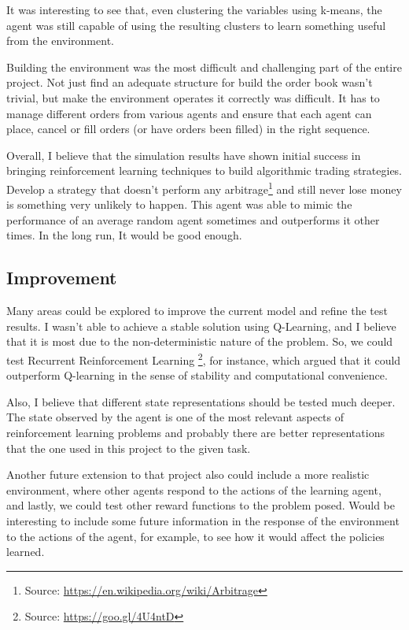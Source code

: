 \documentclass[a4paper]{article}
\begin{document}
It was interesting to see that, even clustering the variables using k-means, the agent was still capable of using the resulting clusters to learn something useful from the environment.

Building the environment was the most difficult and challenging part of the entire project. Not just find an adequate structure for build the order book wasn't trivial, but make the environment operates it correctly was difficult. It has to manage different orders from various agents and ensure that each agent can place, cancel or fill orders (or have orders been filled) in the right sequence.

Overall, I believe that the simulation results have shown initial success in bringing reinforcement learning techniques to build algorithmic trading strategies. Develop a strategy that doesn't perform any arbitrage\footnote{Source: \url{https://en.wikipedia.org/wiki/Arbitrage}} and still never lose money is something very unlikely to happen. This agent was able to mimic the performance of an average random agent sometimes and outperforms it other times. In the long run, It would be good enough.


\subsection{Improvement}

Many areas could be explored to improve the current model and refine the test results. I wasn't able to achieve a stable solution using Q-Learning, and I believe that it is most due to the non-deterministic nature of the problem. So, we could test Recurrent Reinforcement Learning \footnote{Source: \url{https://goo.gl/4U4ntD}}, for instance, which \cite{du1algorithm} argued that it could outperform Q-learning in the sense of stability and computational convenience.

Also, I believe that different state representations should be tested much deeper. The state observed by the agent is one of the most relevant aspects of reinforcement learning problems and probably there are better representations that the one used in this project to the given task.

Another future extension to that project also could include a more realistic environment, where other agents respond to the actions of the learning agent, and lastly, we could test other reward functions to the problem posed. Would be interesting to include some future information in the response of the environment to the actions of the agent, for example, to see how it would affect the policies learned.




\end{document}
